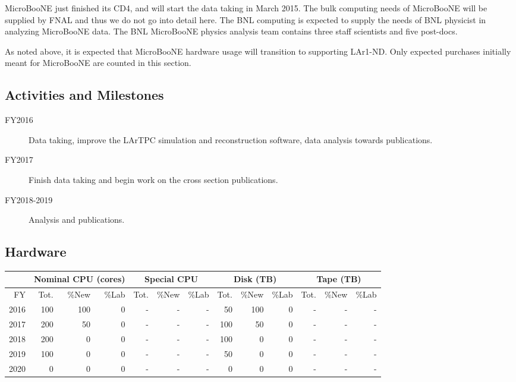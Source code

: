 \documentclass[pdftex,12pt,letter]{article}
\begin{document}
MicroBooNE just finished its CD4, and will start the data taking in March 2015. 
The bulk computing needs of MicroBooNE will be supplied by FNAL and 
thus we do not go into detail here. The BNL computing is expected to supply
the needs of BNL physicist in analyzing MicroBooNE data. The BNL MicroBooNE
physics analysis team contains three staff scientists and five post-docs. 

As noted above, it is expected that MicroBooNE hardware usage will
transition to supporting LAr1-ND.
Only expected purchases initially meant for MicroBooNE are counted in
this section.


\subsection{Activities and Milestones}

\begin{description}
\item[FY2016] Data taking, improve the LArTPC simulation and reconstruction software, data analysis towards publications.
\item[FY2017] Finish data taking and begin work on the cross section publications.
\item[FY2018-2019] Analysis and publications.
\end{description}

\subsection{Hardware}

\begin{tabular}[h]{|r || r|r|r || r|r|r || r|r|r || r|r|r ||}
  \hline
   & \multicolumn{3}{c||}{Nominal CPU (cores)} & \multicolumn{3}{c||}{Special CPU} & \multicolumn{3}{c||}{Disk (TB)} & \multicolumn{3}{c||}{Tape (TB)} \\
   \hline
  FY & Tot. & \%New & \%Lab & Tot. & \%New & \%Lab & Tot. & \%New & \%Lab & Tot. & \%New & \%Lab \\
  \hline
  2016 &100 &100 &  0  &- & - & - &50 &100 & 0 &- & - & - \\
  \hline
  2017 &200 &50  &  0  &- & - & - &100 &50 & 0 &- & - & - \\
  \hline
  2018 &200 &0   &  0  &- & - & - &100 & 0 & 0 &- & - & - \\
  \hline
  2019 &100 &0   &  0  &- & - & - & 50 & 0 & 0 &- & - & - \\
  \hline
  2020 &0   &0   &  0  &- & - & - &  0 & 0 & 0 &- & - & - \\
  \hline
\end{tabular}
\end{document}
